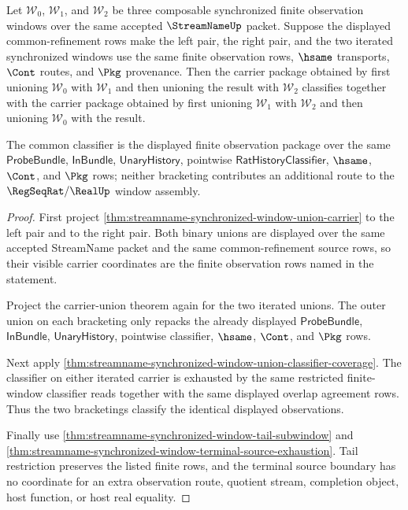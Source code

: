 \begin{theorem}
\label{thm:streamname-window-union-associativity}
Let $\mathcal W_0$, $\mathcal W_1$, and $\mathcal W_2$ be three composable
synchronized finite observation windows over the same accepted
$\StreamNameUp$ packet. Suppose the displayed common-refinement rows make the
left pair, the right pair, and the two iterated synchronized windows use the
same finite observation rows, $\hsame$ transports, $\Cont$ routes, and $\Pkg$
provenance. Then the carrier package obtained by first unioning
$\mathcal W_0$ with $\mathcal W_1$ and then unioning the result with
$\mathcal W_2$ classifies together with the carrier package obtained by first
unioning $\mathcal W_1$ with $\mathcal W_2$ and then unioning
$\mathcal W_0$ with the result.

The common classifier is the displayed finite observation package over the
same $\mathsf{ProbeBundle}$, $\mathsf{InBundle}$, $\mathsf{UnaryHistory}$,
pointwise $\mathsf{RatHistoryClassifier}$, $\hsame$, $\Cont$, and $\Pkg$ rows;
neither bracketing contributes an additional route to the
$\RegSeqRat/\RealUp$ window assembly.
\end{theorem}
\begin{proof}
First project \autoref{thm:streamname-synchronized-window-union-carrier} to the
left pair and to the right pair. Both binary unions are displayed over the
same accepted StreamName packet and the same common-refinement source rows, so
their visible carrier coordinates are the finite observation rows named in the
statement.

Project the carrier-union theorem again for the two iterated unions. The
outer union on each bracketing only repacks the already displayed
$\mathsf{ProbeBundle}$, $\mathsf{InBundle}$, $\mathsf{UnaryHistory}$,
pointwise classifier, $\hsame$, $\Cont$, and $\Pkg$ rows.

Next apply
\autoref{thm:streamname-synchronized-window-union-classifier-coverage}. The
classifier on either iterated carrier is exhausted by the same restricted
finite-window classifier reads together with the same displayed overlap
agreement rows. Thus the two bracketings classify the identical displayed
observations.

Finally use
\autoref{thm:streamname-synchronized-window-tail-subwindow} and
\autoref{thm:streamname-synchronized-window-terminal-source-exhaustion}. Tail
restriction preserves the listed finite rows, and the terminal source boundary
has no coordinate for an extra observation route, quotient stream, completion
object, host function, or host real equality.
\end{proof}

